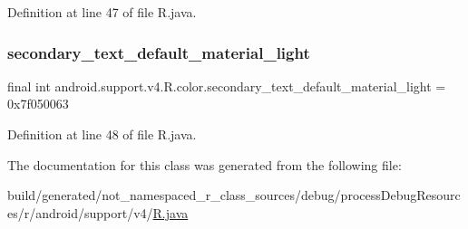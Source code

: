 Definition at line 47 of file R.\+java.

\mbox{\label{classandroid_1_1support_1_1v4_1_1_r_1_1color_a3cc6c4f9f00257e09e9f62fbbcef9823}} 
\subsubsection{\texorpdfstring{secondary\_text\_default\_material\_light}{secondary\_text\_default\_material\_light}}
{\footnotesize\ttfamily final int android.\+support.\+v4.\+R.\+color.\+secondary\+\_\+text\+\_\+default\+\_\+material\+\_\+light = 0x7f050063\hspace{0.3cm}{\ttfamily [static]}}



Definition at line 48 of file R.\+java.



The documentation for this class was generated from the following file\+:\begin{DoxyCompactItemize}
\item 
build/generated/not\+\_\+namespaced\+\_\+r\+\_\+class\+\_\+sources/debug/process\+Debug\+Resources/r/android/support/v4/\mbox{\hyperlink{android_2support_2v4_2_r_8java}{R.\+java}}\end{DoxyCompactItemize}

